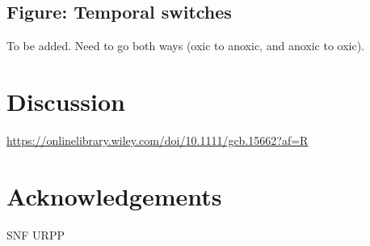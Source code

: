 \documentclass{article}
\begin{document}
\hypertarget{figure-temporal-switches}{%
\subsection{Figure: Temporal switches}\label{figure-temporal-switches}}

To be added. Need to go both ways (oxic to anoxic, and anoxic to oxic).

\hypertarget{discussion}{%
\section{Discussion}\label{discussion}}

\url{https://onlinelibrary.wiley.com/doi/10.1111/gcb.15662?af=R}

\hypertarget{acknowledgements}{%
\section{Acknowledgements}\label{acknowledgements}}

SNF URPP
\end{document}
